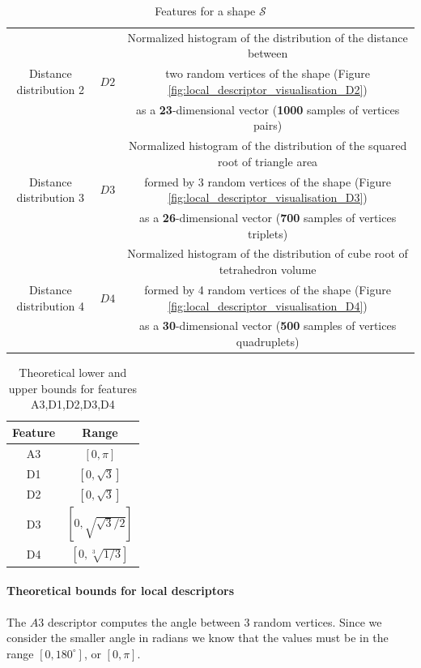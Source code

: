 \begin{table}[ht]
{\begin{tabular}{c|c|c}
        & & Normalized histogram of the distribution of the distance between  \\
        Distance distribution 2 & $D2$ & two random vertices of the shape (Figure \ref{fig:local_descriptor_visualisation_D2})\\
        & & as a \textbf{23}-dimensional vector (\textbf{1000} samples of vertices pairs)\\
        \hline
        
        & & Normalized histogram of the distribution of the squared root of triangle area \\
        Distance distribution 3 & $D3$ & formed by 3 random vertices of the shape (Figure \ref{fig:local_descriptor_visualisation_D3})\\
        & & as a \textbf{26}-dimensional vector (\textbf{700} samples of vertices triplets)\\
        \hline
        
        & & Normalized histogram of the distribution of cube root of tetrahedron volume \\
        Distance distribution 4 & $D4$ & formed by 4 random vertices of the shape (Figure \ref{fig:local_descriptor_visualisation_D4})\\
        & & as a \textbf{30}-dimensional vector (\textbf{500} samples of vertices quadruplets)\\
    \end{tabular}
    }
    \caption{Features for a shape $\mathcal{S}$}
    \label{tab:features}
\end{table}

\begin{table}[ht]
    \centering
    \begin{tabular}{c|c}
        Feature & Range \\
        \hline
        A3 & $[0, \pi]$ \\
        D1 & $[0, \sqrt{3}]$\\
        D2 & $[0, \sqrt{3}]$\\
        D3 & $[0, \sqrt{\sqrt{3}/2}]$\\
        D4 & $[0, \sqrt[3]{1/3}]$\\
    \end{tabular}
    \caption{Theoretical lower and upper bounds for features A3,D1,D2,D3,D4}
    \label{tab:feature-histogram-ranges}
\end{table}

\paragraph{Theoretical bounds for local descriptors}
The $A3$ descriptor computes the angle between 3 random vertices.
Since we consider the smaller angle in radians we  know that the values must be in the range $[0, 180^{\circ}]$, or
$[0, \pi]$.

